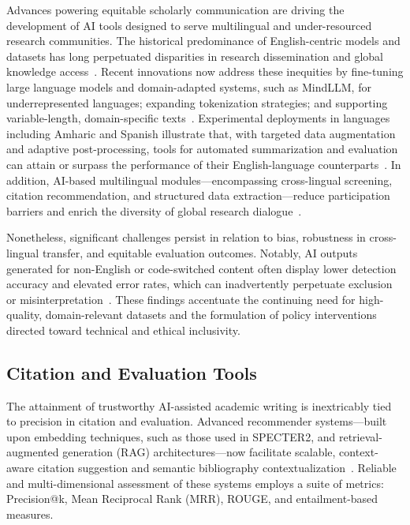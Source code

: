 Advances powering equitable scholarly communication are driving the development of AI tools designed to serve multilingual and under-resourced research communities. The historical predominance of English-centric models and datasets has long perpetuated disparities in research dissemination and global knowledge access~\cite{ref90,ref93,ref97,ref98,ref100,ref104,ref105,ref110}. Recent innovations now address these inequities by fine-tuning large language models and domain-adapted systems, such as MindLLM, for underrepresented languages; expanding tokenization strategies; and supporting variable-length, domain-specific texts~\cite{ref90,ref97,ref100,ref105,ref110}. Experimental deployments in languages including Amharic and Spanish illustrate that, with targeted data augmentation and adaptive post-processing, tools for automated summarization and evaluation can attain or surpass the performance of their English-language counterparts~\cite{ref93,ref97,ref98,ref104,ref110}. In addition, AI-based multilingual modules—encompassing cross-lingual screening, citation recommendation, and structured data extraction—reduce participation barriers and enrich the diversity of global research dialogue~\cite{ref90,ref93,ref98,ref105}.

Nonetheless, significant challenges persist in relation to bias, robustness in cross-lingual transfer, and equitable evaluation outcomes. Notably, AI outputs generated for non-English or code-switched content often display lower detection accuracy and elevated error rates, which can inadvertently perpetuate exclusion or misinterpretation~\cite{ref90,ref93,ref98,ref105,ref110}. These findings accentuate the continuing need for high-quality, domain-relevant datasets and the formulation of policy interventions directed toward technical and ethical inclusivity.

\subsection{Citation and Evaluation Tools}

The attainment of trustworthy AI-assisted academic writing is inextricably tied to precision in citation and evaluation. Advanced recommender systems—built upon embedding techniques, such as those used in SPECTER2, and retrieval-augmented generation (RAG) architectures—now facilitate scalable, context-aware citation suggestion and semantic bibliography contextualization~\cite{ref107}. Reliable and multi-dimensional assessment of these systems employs a suite of metrics: Precision@k, Mean Reciprocal Rank (MRR), ROUGE, and entailment-based measures.

